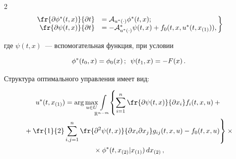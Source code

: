 \begin{multicols}{2}
\begin{equation}
\label{eqPhiPsiOp}


\hspace*{-3.5mm}\left.


\begin{array}{rl}


  \fr{\partial \phi^*(t,x)}{\partial t} &= \mathcal{A}_{u^*(\cdot)} \phi^*(t,x); \\


  \fr{\partial \psi(t,x)}{\partial t} &= - \mathcal{A}^*_{u^*(\cdot)} \psi(t,x) + f_0(t,x,u^*(t,x_{(1)})),


  \end{array}\!\!


  \right\}\!\!\!\!


\end{equation}


где $\psi(t,x)$~--- вспомогательная функция, при условии


\begin{equation}


\label{eqPhiPsiCond}


  \phi^*(t_0,x) = \phi_0(x)\,;\enskip \psi(t_1,x) = - F(x)\,.


\end{equation}





Структура оптимального управления имеет вид:


\begin{multline}


\label{eqOptUStr}


  u^*(t,x_{(1)}) = \arg\max\limits_{u \in U} \!\!\!


  \int\limits_{\mathbb{R}^{n-m}}\!\! \left\{ \!


  \vphantom{\fr{1}{2}\sum\limits_{i,j = 1}^n 


\fr{\partial^2 \psi(t,x)}{\partial x_i \partial x_j}}


  \sum\limits_{i = 1}^n 


  \fr{\partial \psi(t,x)}{\partial x_i} f_i(t,x,u) +{} \right.\hspace*{-0.6pt}\\


\left.{}  + \fr{1}{2} \sum\limits_{i,j = 1}^n 


\fr{\partial^2 \psi(t,x)}{\partial x_i \partial x_j} g_{ij}(t,x,u) - f_0(t,x,u) \right\} \times{}\\


{}\times


\phi^*(t,x_{(2)} | x_{(1)})\, dx_{(2)}\,,



\end{multline}
\end{multicols}
